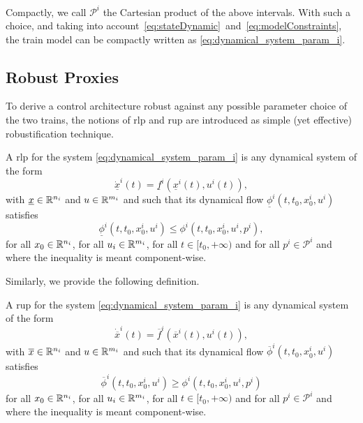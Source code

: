 Compactly, we call $\mathcal{P}^i$ the Cartesian product of the above intervals.  With such a choice, and taking into account~\eqref{eq:stateDynamic}~and~\eqref{eq:modelConstraints}, the train model can be compactly  written as \eqref{eq:dynamical_system_param_i}.






\subsection{Robust Proxies}
\label{subsec:robustProxies}
%
To derive a control architecture robust against any possible parameter choice of the two trains, 
the notions of \gls{rlp} and \gls{rup} are  introduced as simple (yet effective) robustification technique. 
%
\begin{definitionNoPoint}\label{def:rlp}
	A \gls{rlp} for the system \eqref{eq:dynamical_system_param_i} is any dynamical system of the form
	\begin{equation} \label{eq:rlp}
		\underline{\dot{x}}^i(t) = \underline{f}^i(\underline{x}^i(t),u^i(t)),
	\end{equation}
	with $\underline{x}\in \Bbb{R}^{n_i}$ and $u\in\Bbb{R}^{m_i}$ and such that its dynamical flow $\underline{\phi}^i\left(t,t_0,x_0^i,u^i\right)$ satisfies 
	\begin{equation}\label{lemma:rlpProxy}
		\underline{\phi}^i\left(t,t_0,x_0^i,u^i\right) \leq \phi^i\left(t,t_0,x_0^i,u^i,p^i\right), 
	\end{equation}
	for all $x_0\in\Bbb{R}^{n_i}$, for all $u_i \in \Bbb{R}^{m_i}$, for all $t\in [t_0, +\infty)$ and for all $p^i\in\mathcal{P}^i$ and where the inequality is meant component-wise.
\end{definitionNoPoint}

Similarly, we provide the following definition. 

\begin{definitionNoPoint}\label{def:rup}
	
	A \gls{rup} for the system \eqref{eq:dynamical_system_param_i} is any dynamical system of the form
	\begin{equation} \label{eq:rup}
		\dot{\overline{x}}^i(t) = \overline{f}^i(\overline{x}^i(t),u^i(t)),
	\end{equation}
	with $\overline{x}\in \Bbb{R}^{n_i}$ and $u\in\Bbb{R}^{m_i}$ and such that its dynamical flow $\overline{\phi}^i\left(t,t_0,x_0^i,u^i\right)$ satisfies 
	\begin{equation}\label{lemma:rupProxy}
		\overline{\phi}^i\left(t,t_0,x_0^i,u^i\right) \geq \phi^i\left(t,t_0,x_0^i,u^i,p^i\right)
	\end{equation}
	for all $x_0\in\Bbb{R}^{n_i}$, for all $u_i \in \Bbb{R}^{m_i}$, for all $t\in [t_0, +\infty)$ and for all $p^i\in\mathcal{P}^i$  and where the inequality is meant component-wise.
\end{definitionNoPoint}




